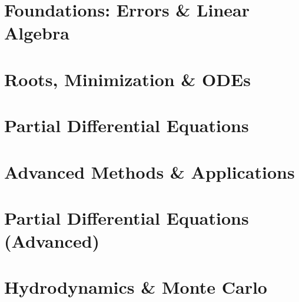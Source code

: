 \documentclass[12pt, a4paper]{article}
\begin{document}
\thispagestyle{empty}
\newpage
\tableofcontents
\newpage

\part{Foundations: Errors \& Linear Algebra}

\newpage

\newpage


\clearpage
\part{Roots, Minimization \& ODEs}

\newpage

\newpage

\newpage


\clearpage
\part{Partial Differential Equations}

\newpage


\clearpage
\part{Advanced Methods \& Applications}

\newpage

\newpage

\newpage

\newpage


\clearpage
\part{Partial Differential Equations (Advanced)}

\newpage

\newpage


\clearpage
\part{Hydrodynamics \& Monte Carlo}

\newpage

\newpage

\newpage

\end{document}
